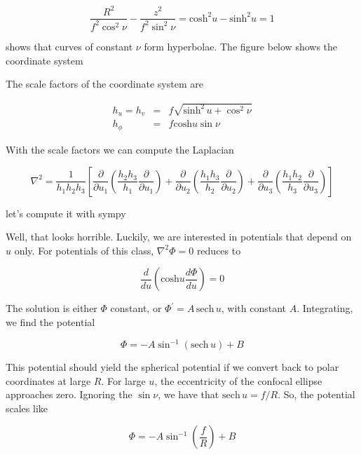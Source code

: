 \begin{equation}
\frac{R^2}{f^2\cos^2\nu} - \frac{z^2}{f^2\sin^2\nu} = \mathrm{cosh}^2 u - \mathrm{sinh}^2 u = 1
\end{equation}

shows that curves of constant $\nu$ form hyperbolae. The figure below shows the coordinate system 


The scale factors of the coordinate system are 


\begin{eqnarray}
h_u = h_v &=& f\sqrt{\mathrm{sinh}^2 \, u + \cos^2\nu}\\
h_\phi &=& f \mathrm{cosh} u\sin\nu
\end{eqnarray}


With the scale factors we can compute the Laplacian 

\begin{equation}
\nabla^2 = \frac{1}{h_1h_2h_3} \left[ \frac{\partial}{\partial u_1} \left(\frac{h_2h_3}{h_1} \frac{\partial}{\partial u_1} \right)+\frac{\partial}{\partial u_2} \left(\frac{h_1h_3}{h_2} \frac{\partial}{\partial u_2} \right)+\frac{\partial}{\partial u_3} \left(\frac{h_1h_2}{h_3} \frac{\partial}{\partial u_3} \right)
\right]
\end{equation}


let's compute it with sympy 



Well, that looks horrible. Luckily, we are interested in potentials that depend on $u$ only. For potentials of this class, $\nabla^2 \varPhi = 0$  reduces to 


\begin{equation}
\frac{d}{du} \left( \mathrm{cosh} u \frac{d\varPhi}{du}\right)=0
\end{equation}

The solution is either $\varPhi$ constant, or $\varPhi^\prime = A\,\mathrm{sech}\,u$, with constant $A$. Integrating, we find the potential 

\begin{equation}
\varPhi = -A\sin^{-1}\left(\mathrm{sech}\,u\right) + B 
\end{equation}


This potential should yield the spherical potential if we convert back to polar coordinates at large $R$. For large $u$, the eccentricity of the confocal ellipse approaches zero. Ignoring the $\sin\nu$,  we have that $\mathrm{sech}\,u = f/R$. So, the potential scales like  


\begin{equation}
\varPhi = -A\sin^{-1}\left(\frac{f}{R}\right) + B 
\end{equation}

